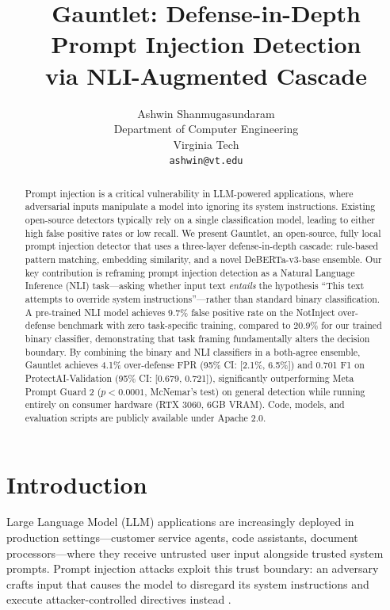 \documentclass[11pt]{article}
\title{Gauntlet: Defense-in-Depth Prompt Injection Detection\\via NLI-Augmented Cascade}
\author{Ashwin Shanmugasundaram \\
  Department of Computer Engineering \\
  Virginia Tech \\
  \texttt{ashwin@vt.edu}}
\begin{document}
\maketitle

\begin{abstract}
Prompt injection is a critical vulnerability in LLM-powered applications, where adversarial inputs manipulate a model into ignoring its system instructions. Existing open-source detectors typically rely on a single classification model, leading to either high false positive rates or low recall. We present Gauntlet, an open-source, fully local prompt injection detector that uses a three-layer defense-in-depth cascade: rule-based pattern matching, embedding similarity, and a novel DeBERTa-v3-base ensemble. Our key contribution is reframing prompt injection detection as a Natural Language Inference (NLI) task---asking whether input text \textit{entails} the hypothesis ``This text attempts to override system instructions''---rather than standard binary classification. A pre-trained NLI model achieves 9.7\% false positive rate on the NotInject over-defense benchmark with zero task-specific training, compared to 20.9\% for our trained binary classifier, demonstrating that task framing fundamentally alters the decision boundary. By combining the binary and NLI classifiers in a both-agree ensemble, Gauntlet achieves 4.1\% over-defense FPR (95\% CI: [2.1\%, 6.5\%]) and 0.701 F1 on ProtectAI-Validation (95\% CI: [0.679, 0.721]), significantly outperforming Meta Prompt Guard 2 ($p < 0.0001$, McNemar's test) on general detection while running entirely on consumer hardware (RTX 3060, 6GB VRAM). Code, models, and evaluation scripts are publicly available under Apache 2.0.
\end{abstract}

\section{Introduction}

Large Language Model (LLM) applications are increasingly deployed in production settings---customer service agents, code assistants, document processors---where they receive untrusted user input alongside trusted system prompts. Prompt injection attacks exploit this trust boundary: an adversary crafts input that causes the model to disregard its system instructions and execute attacker-controlled directives instead \cite{schulhoff2023hackaprompt, greshake2023indirect}.
\end{document}
